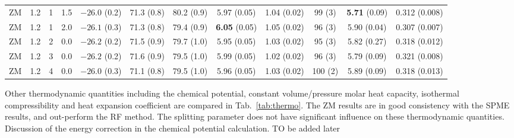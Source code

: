 \documentclass[aip,jcp,a4paper,preprint,unsortedaddress,onecolumn,fleqn]{revtex4-1}
\newcommand{\recheck}[1]{{\color{red} #1}}
\begin{document}
\begin{sidewaystable}
\begin{tabular*}{0.99\textwidth}{@{\extracolsep{\fill}}cccc cccccccc}
    ZM          &1.2 & 1  &1.5 & $-26.0$ (0.2) & 71.3 (0.8)  &80.2 (0.9)           & 5.97 (0.05)               &1.04 (0.02)          & 99 (3)          & \textbf{5.71} (0.09)&        {0.312} (0.008)\\ 
    ZM          &1.2 & 1  &2.0 & $-26.1$ (0.3) & 71.3 (0.8)  &79.4 (0.9)           & \textbf{6.05} (0.05)      &1.05 (0.02)          & 96 (3)          &        {5.90} (0.04)&        {0.307} (0.007)\\\hline
    ZM          &1.2 & 2  &0.0 & $-26.2$ (0.2) & 71.5 (0.9)  &79.7 (1.0)           & 5.95 (0.05)               &1.03 (0.02)          & 95 (3)          &         5.82  (0.27)&         0.318  (0.012)\\
    ZM          &1.2 & 3  &0.0 & $-26.2$ (0.2) & 71.6 (0.9)  &79.5 (1.0)           & 5.99 (0.05)               &1.02 (0.02)          & 96 (3)          &         5.79  (0.09)&         0.321  (0.008)\\
    ZM          &1.2 & 4  &0.0 & $-26.0$ (0.3) & 71.1 (0.8)  &79.5 (1.0)           & 5.96 (0.05)               &1.03 (0.02)          &100 (2)          &         5.89  (0.09)&         0.318  (0.013)\\
    \hline\hline
  \end{tabular*}
  \label{tab:thermo}
\end{sidewaystable}

Other thermodynamic quantities including the chemical potential,
constant volume/pressure molar heat capacity, isothermal
compressibility and heat expansion coefficient are compared in
Tab.~\ref{tab:thermo}.
The ZM results are in good consistency with the SPME results, and out-perform
the RF method.
The splitting parameter does not have significant influence on these thermodynamic quantities.
\recheck{Discussion of the energy correction in the chemical potential calculation. TO be added later}
\end{document}
